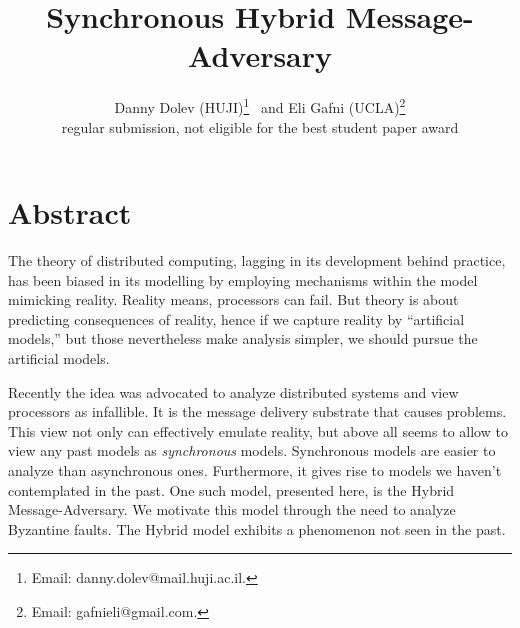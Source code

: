 \documentclass[11pt]{article}
\begin{document}
\title{Synchronous Hybrid Message-Adversary}
\author{Danny Dolev (HUJI)\footnote{Email: danny.dolev@mail.huji.ac.il.} \ and
Eli Gafni (UCLA)\footnote{Email: gafnieli@gmail.com.}\\[1.2ex]
regular submission, not eligible for the best student paper award\vspace{-2ex}}

\date{}

\maketitle

\thispagestyle{empty}

\setcounter{page}{0}



\section*{Abstract}
The theory of distributed computing, lagging in its development behind practice, has been biased in its modelling by  employing mechanisms within the model mimicking reality. Reality means, processors can fail.
But theory is about predicting consequences of reality, hence if we capture reality by ``artificial models,'' but those nevertheless make analysis simpler, we should
pursue the artificial models.

Recently the idea was advocated to analyze distributed systems and view processors as infallible. It is the message delivery substrate that causes problems.
This view not only can effectively emulate reality, but above all seems to allow to view any past models as 
\emph{synchronous} 
models. Synchronous models are easier to analyze than asynchronous ones. Furthermore, it gives rise to models we haven't contemplated in the past. One such model, presented here, is the Hybrid Message-Adversary. We motivate this model through the need to analyze Byzantine faults. The Hybrid model exhibits a phenomenon not seen in the past.
\end{document}
